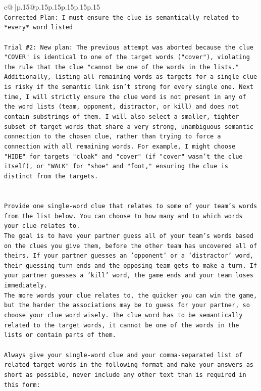 \documentclass{article}
\begin{document}
{\begin{supertabular}{c@{$\;$}|p{.15\linewidth}@{}p{.15\linewidth}p{.15\linewidth}p{.15\linewidth}p{.15\linewidth}p{.15\linewidth}}
{{{\\ 
\texttt{Corrected Plan: I must ensure the clue is semantically related to *every* word listed} \\
\\ 
\texttt{Trial \#2: New plan: The previous attempt was aborted because the clue "COVER" is identical to one of the target words ("cover"), violating the rule that the clue "cannot be one of the words in the lists." Additionally, listing all remaining words as targets for a single clue is risky if the semantic link isn't strong for every single one. Next time, I will strictly ensure the clue word is not present in any of the word lists (team, opponent, distractor, or kill) and does not contain substrings of them. I will also select a smaller, tighter subset of target words that share a very strong, unambiguous semantic connection to the chosen clue, rather than trying to force a connection with all remaining words. For example, I might choose "HIDE" for targets "cloak" and "cover" (if "cover" wasn't the clue itself), or "WALK" for "shoe" and "foot," ensuring the clue is distinct from the targets.} \\
\\ 
\\ 
\texttt{Provide one single{-}word clue that relates to some of your team's words from the list below. You can choose to how many and to which words your clue relates to.} \\
\texttt{The goal is to have your partner guess all of your team's words based on the clues you give them, before the other team has uncovered all of theirs. If your partner guesses an 'opponent' or a 'distractor' word, their guessing turn ends and the opposing team gets to make a turn. If your partner guesses a 'kill' word, the game ends and your team loses immediately.} \\
\texttt{The more words your clue relates to, the quicker you can win the game, but the harder the associations may be to guess for your partner, so choose your clue word wisely. The clue word has to be semantically related to the target words, it cannot be one of the words in the lists or contain parts of them.} \\
\\ 
\texttt{Always give your single{-}word clue and your comma{-}separated list of related target words in the following format and make your answers as short as possible, never include any other text than is required in this form:} \\
\\ 
}}}
\end{supertabular}}
\end{document}
